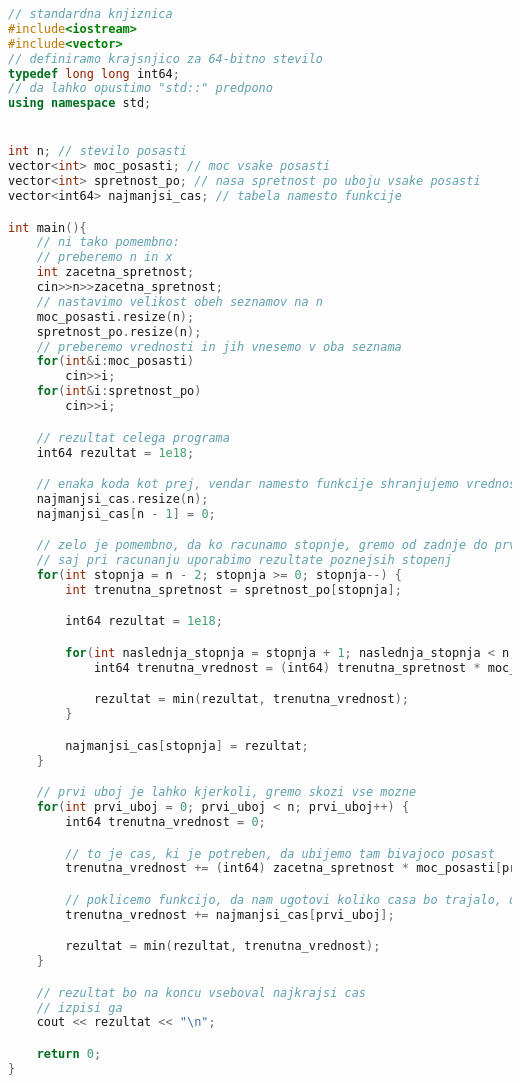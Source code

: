 \begin{lstlisting}[label={lst:code2}, language=C++]
// standardna knjiznica
#include<iostream>
#include<vector>
// definiramo krajsnjico za 64-bitno stevilo
typedef long long int64;
// da lahko opustimo "std::" predpono
using namespace std;


int n; // stevilo posasti
vector<int> moc_posasti; // moc vsake posasti
vector<int> spretnost_po; // nasa spretnost po uboju vsake posasti
vector<int64> najmanjsi_cas; // tabela namesto funkcije

int main(){
    // ni tako pomembno:
    // preberemo n in x
    int zacetna_spretnost;
    cin>>n>>zacetna_spretnost;
    // nastavimo velikost obeh seznamov na n
    moc_posasti.resize(n);
    spretnost_po.resize(n);
    // preberemo vrednosti in jih vnesemo v oba seznama
    for(int&i:moc_posasti)
        cin>>i;
    for(int&i:spretnost_po)
        cin>>i;

    // rezultat celega programa
    int64 rezultat = 1e18;

    // enaka koda kot prej, vendar namesto funkcije shranjujemo vrednosti v tabelo
    najmanjsi_cas.resize(n);
    najmanjsi_cas[n - 1] = 0;

    // zelo je pomembno, da ko racunamo stopnje, gremo od zadnje do prve,
    // saj pri racunanju uporabimo rezultate poznejsih stopenj
    for(int stopnja = n - 2; stopnja >= 0; stopnja--) {
        int trenutna_spretnost = spretnost_po[stopnja];

        int64 rezultat = 1e18;

        for(int naslednja_stopnja = stopnja + 1; naslednja_stopnja < n; naslednja_stopnja++) {
            int64 trenutna_vrednost = (int64) trenutna_spretnost * moc_posasti[naslednja_stopnja] + najmanjsi_cas[naslednja_stopnja];

            rezultat = min(rezultat, trenutna_vrednost);
        }

        najmanjsi_cas[stopnja] = rezultat;
    }

    // prvi uboj je lahko kjerkoli, gremo skozi vse mozne
    for(int prvi_uboj = 0; prvi_uboj < n; prvi_uboj++) {
        int64 trenutna_vrednost = 0;

        // to je cas, ki je potreben, da ubijemo tam bivajoco posast
        trenutna_vrednost += (int64) zacetna_spretnost * moc_posasti[prvi_uboj];

        // poklicemo funkcijo, da nam ugotovi koliko casa bo trajalo, da pridemo do konca
        trenutna_vrednost += najmanjsi_cas[prvi_uboj];

        rezultat = min(rezultat, trenutna_vrednost);
    }

    // rezultat bo na koncu vseboval najkrajsi cas
    // izpisi ga
    cout << rezultat << "\n";

    return 0;
}
\end{lstlisting}